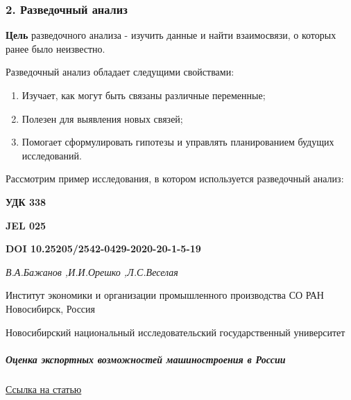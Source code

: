 \documentclass[
]{article}
\providecommand{\tightlist}{%
  \setlength{\itemsep}{0pt}\setlength{\parskip}{0pt}}
\begin{document}
\hypertarget{ux440ux430ux437ux432ux435ux434ux43eux447ux43dux44bux439-ux430ux43dux430ux43bux438ux437}{%
\subsubsection{2. Разведочный
анализ}\label{ux440ux430ux437ux432ux435ux434ux43eux447ux43dux44bux439-ux430ux43dux430ux43bux438ux437}}

\textbf{Цель} разведочного анализа - изучить данные и найти взаимосвязи,
о которых ранее было неизвестно.

Разведочный анализ обладает следущими свойствами:

\begin{enumerate}
\def\labelenumi{\arabic{enumi}.}
\tightlist
\item
  Изучает, как могут быть связаны различные переменные;
\item
  Полезен для выявления новых связей;
\item
  Помогает сформулировать гипотезы и управлять планированием будущих
  исследований.
\end{enumerate}

Рассмотрим пример исследования, в котором используется разведочный
анализ:

\textbf{УДК 338}

\textbf{JEL 025}

\textbf{DOI 10.25205/2542-0429-2020-20-1-5-19}

\emph{В.А.Бажанов ,И.И.Орешко ,Л.С.Веселая}

Институт экономики и организации промышленного производства СО РАН
Новосибирск, Россия

Новосибирский национальный исследовательский государственный университет

\hypertarget{ux43eux446ux435ux43dux43aux430-ux44dux43aux441ux43fux43eux440ux442ux43dux44bux445-ux432ux43eux437ux43cux43eux436ux43dux43eux441ux442ux435ux438-ux43cux430ux448ux438ux43dux43eux441ux442ux440ux43eux435ux43dux438ux44f-ux432-ux440ux43eux441ux441ux438ux438}{%
\subparagraph{\texorpdfstring{\emph{Оценка экспортных возможностей
машиностроения в
России}}{Оценка экспортных возможностей машиностроения в России}}\label{ux43eux446ux435ux43dux43aux430-ux44dux43aux441ux43fux43eux440ux442ux43dux44bux445-ux432ux43eux437ux43cux43eux436ux43dux43eux441ux442ux435ux438-ux43cux430ux448ux438ux43dux43eux441ux442ux440ux43eux435ux43dux438ux44f-ux432-ux440ux43eux441ux441ux438ux438}}

\href{https://journals.nsu.ru/upload/iblock/697/01\%20(1).pdf}{Ссылка на
статью}
\end{document}
